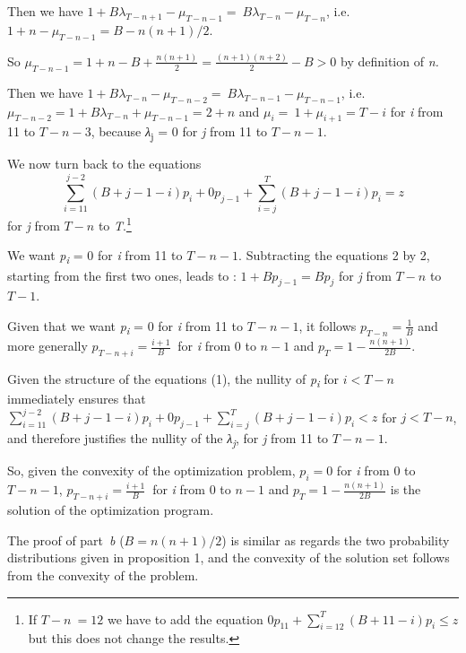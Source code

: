 \begin{Article}
\begin{refsection}[Umbhauer]
\begin{appendices}
Then we have \(1 + B\lambda_{T - n + 1} - \mu_{T - n - 1} = \ B\lambda_{T - n} - \mu_{T - n}\), i.e. \(1 + n - \mu_{T - n - 1} = B - n(n + 1)/2\).

So \(\mu_{T - n - 1} = 1 + n - B + \frac{n(n + 1)}{2} = \frac{(n + 1)(n + 2)}{2} - B > 0\)
by definition of \emph{n.}

Then we have \(1 + B\lambda_{T - n} - \mu_{T - n - 2} = \ B\lambda_{T - n - 1} - \mu_{T - n - 1}\), i.e. \(\mu_{T - n - 2} = 1 + B\lambda_{T - n} + \mu_{T - n - 1} = 2 + n\) and
\(\mu_{i} = \ 1 + \mu_{i + 1} = T - i\) for \emph{i} from 11 to
\(T - n - 3\), because \emph{λ}\textsubscript{j} = 0 for \emph{j} from 11 to
\(T - n - 1\).

We now turn back to the equations
\[\sum_{i = 11}^{j - 2}{(B + j - 1 - i)p_{i} + 0p_{j - 1} + \sum_{i = j}^{T}{(B + j - 1 - i)p_{i} = z}}\]
for \emph{j} from $T-n$ to \emph{T}.\footnote{If $T - n~= 12$ we
  have to add the equation \(0p_{11} + \sum_{i = 12}^{T}{(B + 11 - i)p_{i} \leq z}\) but this does not change the results.}

We want \emph{p\textsubscript{i}} = 0 for \emph{i} from 11 to
\(T - n - 1\). Subtracting the equations 2 by 2, starting from the first
two ones, leads to : \(1 + Bp_{j - 1} = Bp_{j}\) for \emph{j} from
\(T - n\) to \(T - 1\).

Given that we want \emph{p\textsubscript{i }}= 0 for \emph{i} from 11 to
\(T - n - 1\), it follows \(p_{T - n} = \frac{1}{B}\) and more generally
\(p_{T - n + i} = \frac{i + 1}{B}\ \) for \emph{i} from 0 to \(n - 1\)
and \(p_{T} = 1 - \frac{n(n + 1)}{2B}\).

Given the structure of the equations (1), the nullity of
\emph{p\textsubscript{i}} for \(i < T - n\) immediately ensures that
\(\sum_{i = 11}^{j - 2}{(B + j - 1 - i)p_{i} + 0p_{j - 1} + \sum_{i = j}^{T}{(B + j - 1 - i)p_{i} < z}}\)
for \(j < T - n\), and therefore justifies the nullity of the
\emph{λ\textsubscript{j}}, for \emph{j} from 11 to \(T - n - 1\).

So, given the convexity of the optimization problem, \(p_{i} = 0\) for
\emph{i} from 0 to \(T - n - 1\), \(p_{T - n + i} = \frac{i + 1}{B}\ \)
for \emph{i} from 0 to \(n - 1\) and \(p_{T} = 1 - \frac{n(n + 1)}{2B}\)
is the solution of the optimization program.

The proof of part~\emph{b} (\(B = n(n + 1)/2\)) is similar as regards the
two probability distributions given in proposition 1, and the convexity
of the solution set follows from the convexity of the problem.


\end{appendices}
\end{refsection}
\end{Article}
